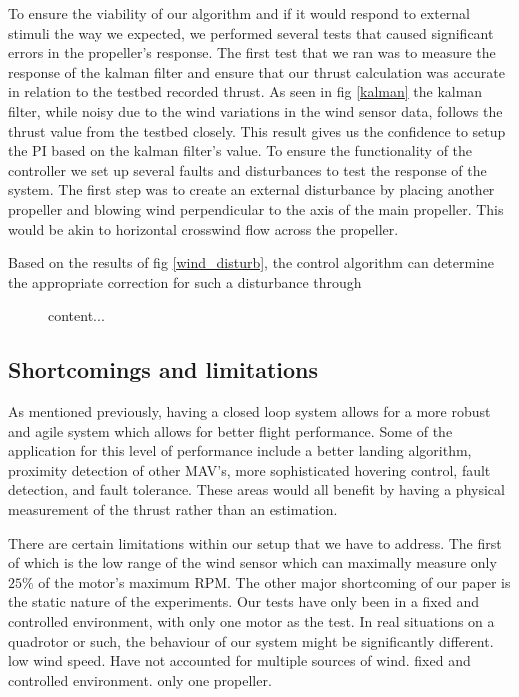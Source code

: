 \documentclass[conference]{IEEEtran}
\begin{document}
	To ensure the viability of our algorithm and if it would respond to external stimuli the way we expected, we performed several tests that caused significant errors in the propeller's response. The first test that we ran was to measure the response of the kalman filter and ensure that our thrust calculation was accurate in relation to the testbed recorded thrust. As seen in fig \ref{kalman} the kalman filter, while noisy due to the wind variations in the wind sensor data, follows the thrust value from the testbed closely. This result gives us the confidence to setup the PI based on the kalman filter's value. 
	To ensure the functionality of the controller we set up several faults and disturbances to test the response of the system. The first step was to create an external disturbance by placing another propeller and blowing wind perpendicular to the axis of the main propeller. This would be akin to horizontal crosswind flow across the propeller.
	\begin{figure}
		\label{content...}
	\end{figure}
	 Based on the results of fig \ref{wind_disturb}, the control algorithm can determine the appropriate correction for such a disturbance through
	\begin{figure}
		content...
	\end{figure}
	\subsection{Shortcomings and limitations}
	As mentioned previously, having a closed loop system allows for a more robust and agile system which allows for better flight performance. Some of the application for this level of performance include a better landing algorithm, proximity detection of other MAV's, more sophisticated hovering control, fault detection, and fault tolerance. These areas would all benefit by having a physical measurement of the thrust rather than an estimation.
	
	There are certain limitations within our setup that we have to address. The first of which is the low range of the wind sensor which can maximally measure only $25\%$ of the motor's maximum RPM. The other major shortcoming of our paper is the static nature of the experiments. Our tests have only been in a fixed and controlled environment, with only one motor as the test. In real situations on a quadrotor or such, the behaviour of our system might be significantly different.  	
	low wind speed. Have not accounted for multiple sources of wind. fixed and controlled environment. only one propeller. 
\end{document}
